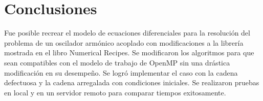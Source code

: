 \section{Conclusiones}

Fue posible recrear el modelo de ecuaciones diferenciales para la resolución del problema de un oscilador armónico acoplado con modificaciones a la librería mostrada en el libro Numerical Recipes. Se modificaron los algoritmos para que sean compatibles con el modelo de trabajo de OpenMP sin una drástica modificación en su desempeño. Se logró implementar el caso con la cadena defectuosa y la cadena arregalada con condiciones iniciales. Se realizaron pruebas en local y en un servidor remoto para comparar tiempos exitosamente. 